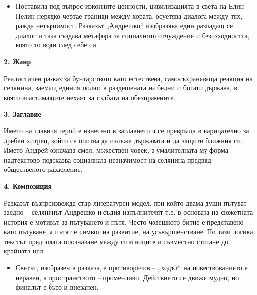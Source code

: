 \documentclass[12pt,a4paper]{article}
\begin{document}
\vspace{0.1cm}

\begin{itemize}[leftmargin=*]
\vspace{-0.45cm}
\item Поставила под въпрос изконните ценности, цивилизацията в света на Елин Пелин нерядко чертае граници между хората, осуетява диалога между тях, ражда нетърпимост. Разказът „Андрешко“ изобразява един разпадащ се диалог и така създава метафора за социалното отчуждение и безизходността, която то води след себе си.
\end{itemize}

\vspace{0.1cm}
 
\textbf{2. Жанр}
\vspace{0.1cm}
 
\indent Реалистичен разказ за бунтарството като естествена, самосъхраняваща реакция на селянина, заемащ единия полюс в раздешената на бедни и богати държава, в която властимащите нехаят за съдбата на обезправените.

\vspace{0.1cm}
 
\textbf{3. Заглавие}
\vspace{0.1cm}
 
\indent Името на главния герой е изнесено в заглавието и се превръща в нарицателно за дребен хитрец, който се опитва да излъже държавата и да защити ближния си. Името Андрей означава смел, мъжествен човек, а умалителната му форма надтекстово подсказва социалната незначимост на селянина предвид общественото разделение.

\vspace{0.1cm}
 
\textbf{4. Композиция}
\vspace{0.1cm}

\indent Разказът възпроизвежда стар литературен модел, при който двама души пътуват заедно – селянинът Андрешко и съдия-изпълнителят т.е. в основата на сюжетната история е мотивът за пътуването и пътя. Често човешкото битие е представено като пътуване, а пътят е символ на развитие, на усъвършенстване. По тази логика текстът предполага опознаване между спътниците и съвместно стигане до крайната цел.

\begin{itemize}[leftmargin=*]
\vspace{-0.20cm}
\item Светът, изобразен в разказа, е противоречив – „ходът“ на повествованието е неравен, а пространството – променливо. Действието се движи мудно, но финалът е бърз и внезапен.
\end{itemize}
\end{document}
